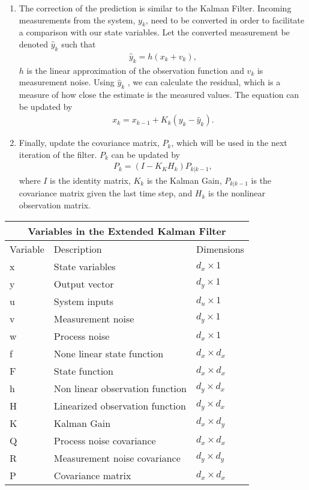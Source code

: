 \begin{enumerate}
    
 
    \item  The correction of the prediction is similar to the Kalman Filter. Incoming measurements from the system, $y_k$, need to be converted in order to facilitate a comparison with our state variables. Let the converted measurement be denoted $\hat y_k$ such that 
    \begin{align*}
        \hat y_k = h( x_k + v_k ),
    \end{align*}
   $h$ is the linear approximation of the observation function and $v_k$ is measurement noise. Using $\hat y_k$ , we can calculate the residual, which is a measure of how close the estimate is the measured values. The equation can be updated by 
     \begin{align*} 
        x_k = x_{k - 1} + K_k(y_k - \hat y_k).
    \end{align*}
    
    
    \item Finally, update the covariance matrix, $P_k $, which will be used in the next iteration of the filter. $P_k $ can be updated by
    \begin{align*} 
        P_k = (I - K_K H_k) P_{k | k-1},
    \end{align*}
    where $I$ is the identity matrix, $K_k$ is the Kalman Gain, $P_{k | k-1}$ is the covariance matrix given the last time step, and $H_k$ is the nonlinear observation matrix.
\end{enumerate} 

\newpage

\begin{center}
    
\centering
\begin{tabular}{ |p{2cm}||p{5cm}|p{2cm}| }
    \hline
    \multicolumn{3}{|c|}{Variables in the Extended Kalman Filter } \\ 
    \hline
    Variable & Description & Dimensions \\
    \hline
   x & State variables  & $d_x \times 1$ \\
    y & Output vector  & $d_y \times 1$ \\
    u & System inputs  & $d_u \times 1$\\
    v & Measurement noise & $d_y \times 1$\\
    w & Process noise & $d_x \times 1$\\
    f & None linear state function  & $d_x \times d_x $  \\ 
    F & State function  & $d_x \times d_x $  \\ 
    h & Non linear observation function & $d_y \times d_x$\\
    H & Linearized observation function & $d_y \times d_x$\\
    K & Kalman Gain  & $d_x \times d_y$\\
    Q & Process noise covariance  & $d_x \times d_x$ \\
    R & Measurement noise covariance &  $d_y \times d_y$\\
    P & Covariance matrix & $d_x \times d_x $  \\ 
    \hline
\end{tabular}
\end{center}
